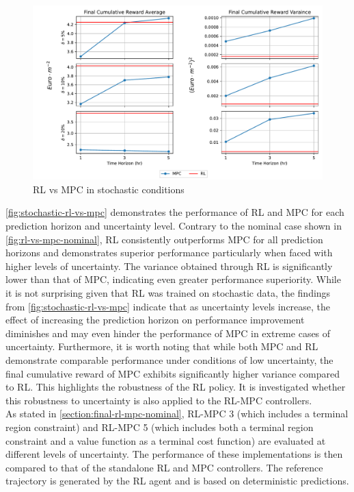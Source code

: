 \begin{figure}[H]
	\centering
	\includegraphics[width=\textwidth]{figures/stochastic_rl_vs_mpc.pdf}
	\caption{RL vs MPC in stochastic conditions}
	\label{fig:stochastic-rl-vs-mpc}
\end{figure}

\autoref{fig:stochastic-rl-vs-mpc} demonstrates the performance of RL and MPC for each prediction horizon and uncertainty level. Contrary to the nominal case shown in \ref{fig:rl-vs-mpc-nominal}, RL consistently outperforms MPC for all prediction horizons and demonstrates superior performance particularly when faced with higher levels of uncertainty. The variance obtained through RL is significantly lower than that of MPC, indicating even greater performance superiority. While it is not surprising given that RL was trained on stochastic data, the findings from \autoref{fig:stochastic-rl-vs-mpc} indicate that as uncertainty levels increase, the effect of increasing the prediction horizon on performance improvement diminishes and may even hinder the performance of MPC in extreme cases of uncertainty. Furthermore, it is worth noting that while both MPC and RL demonstrate comparable performance under conditions of low uncertainty, the final cumulative reward of MPC exhibits significantly higher variance compared to RL. This highlights the robustness of the RL policy. It is investigated whether this robustness to uncertainty is also applied to the RL-MPC controllers.\\
As stated in \autoref{section:final-rl-mpc-nominal}, RL-MPC 3 (which includes a terminal region constraint) and RL-MPC 5 (which includes both a terminal region constraint and a value function as a terminal cost function) are evaluated at different levels of uncertainty. The performance of these implementations is then compared to that of the standalone RL and MPC controllers. The reference trajectory is generated by the RL agent and is based on deterministic predictions.





